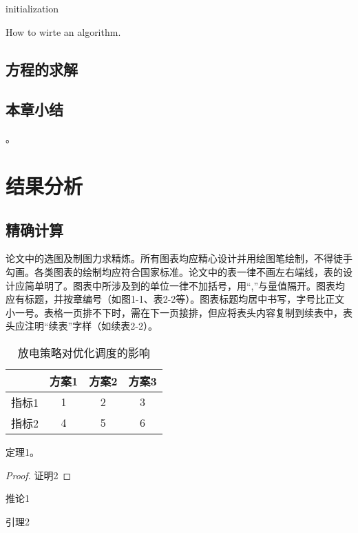 \documentclass[bachelor]{NCEPU-thesis}
\begin{document}
\begin{algorithm}[H]
 initialization\;
 \caption{How to wirte an algorithm.}
\end{algorithm}


\section{方程的求解}

\section{本章小结}
。\chapter{结果分析}
\section{精确计算}

论文中的选图及制图力求精炼。所有图表均应精心设计并用绘图笔绘制，不得徒手勾画。各类图表的绘制均应符合国家标准。论文中的表一律不画左右端线，表的设计应简单明了。图表中所涉及到的单位一律不加括号，用“,”与量值隔开。图表均应有标题，并按章编号（如图1-1、表2-2等）。图表标题均居中书写，字号比正文小一号。表格一页排不下时，需在下一页接排，但应将表头内容复制到续表中，表头应注明“续表”字样（如续表2-2）。
\begin{table}[h]
\caption{放电策略对优化调度的影响}
\begin{tabular}{cccc}
    \toprule
          & 方案1   & 方案2   & 方案3 \\
    \midrule
    指标1   & 1     & 2     & 3 \\
    指标2   & 4     & 5     & 6 \\
    \bottomrule
    \end{tabular}%
\label{tablea}
\end{table}

\begin{figure}[h]
\label{fig2}
\end{figure}


\begin{theorem}
定理1。
\end{theorem}
\begin{proof}
证明2
\end{proof}
\begin{corollary}
推论1
\end{corollary}
\begin{lemma}
引理2
\end{lemma}
\end{document}
